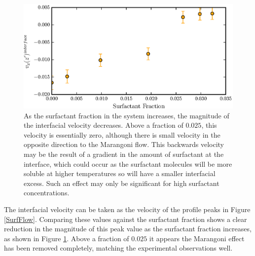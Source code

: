 \FloatBarrier
\begin{figure}[h]
\centering
\includegraphics[scale=0.8]{InterVel}
\caption{As the surfactant fraction in the system increases, the magnitude of the interfacial velocity decreases.
Above a fraction of $0.025$, this velocity is essentially zero, although there is small velocity in the opposite direction to the Marangoni flow.
This backwards velocity may be the result of a gradient in the amount of surfactant at the interface, which could occur as the surfactant molecules will be more soluble at higher temperatures so will have a smaller interfacial excess.
Such an effect may only be significant for high surfactant concentrations.
}
\label{InterVel}
\end{figure}
The interfacial velocity can be taken as the velocity of the profile peaks in Figure \ref{SurfFlow}.
Comparing these values against the surfactant fraction shows a clear reduction in the magnitude of this peak value as the surfactant fraction increases, as shown in Figure \ref{InterVel}.
Above a fraction of $0.025$ it appears the Marangoni effect has been removed completely, matching the experimental observations well.
\FloatBarrier
